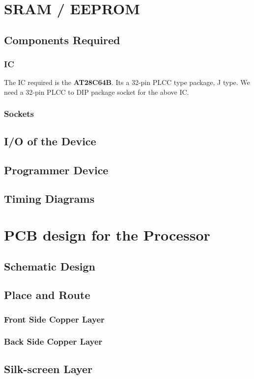 \documentclass{article}
\begin{document}
\section{\textbf{SRAM / EEPROM}}
\subsection{Components Required}
\subsubsection{IC}
The IC required is the \textbf{AT28C64B}.
Its a 32-pin PLCC type package, J type.
We need a 32-pin PLCC to DIP package socket for the above IC.
\subsubsection{Sockets}

\subsection{I/O of the Device}
\subsection{Programmer Device}
\subsection{Timing Diagrams}
\section{\textbf{PCB design for the Processor}}
\subsection{Schematic Design}
\subsection{Place and Route}
\subsubsection{Front Side Copper Layer}
\subsubsection{Back Side Copper Layer}
\subsection{Silk-screen Layer}
\end{document}
